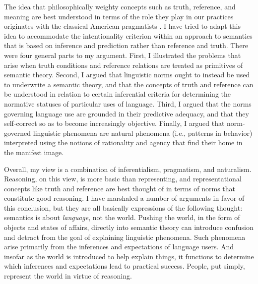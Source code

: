The idea that philosophically weighty concepts such as truth, reference, and meaning are best understood in terms of the role they play in our practices originates with the classical American pragmatists \citep{Misak:2013,Misak:2007,Peirce:1992,Brandom:2011}. I have tried to adapt this idea to accommodate the intentionality criterion within an approach to semantics that is based on inference and prediction rather than reference and truth. There were four general parts to my argument. First, I illustrated the problems that arise when truth conditions and reference relations are treated as primitives of semantic theory. Second, I argued that linguistic norms ought to instead be used to underwrite a semantic theory, and that the concepts of truth and reference can be understood in relation to certain inferential criteria for determining the normative statuses of particular uses of language. Third, I argued that the norms governing language use are grounded in their predictive adequacy, and that they self-correct so as to become increasingly objective. Finally, I argued that norm-governed linguistic phenomena are natural phenomena (i.e., patterns in behavior) interpreted using the notions of rationality and agency that find their home in the manifest image.

Overall, my view is a combination of inferentialism, pragmatism, and naturalism. Reasoning, on this view, is more basic than representing, and representational concepts like truth and reference are best thought of in terms of norms that constitute good reasoning. I have marshaled a number of arguments in favor of this conclusion, but they are all basically expressions of the following thought: semantics is about \textit{language}, not the world. Pushing the world, in the form of objects and states of affairs, directly into semantic theory can introduce confusion and detract from the goal of explaining linguistic phenomena. Such phenomena arise primarily from the inferences and expectations of language users. And insofar as the world is introduced to help explain things, it functions to determine which inferences and expectations lead to practical success. People, put simply, represent the world in virtue of reasoning.
